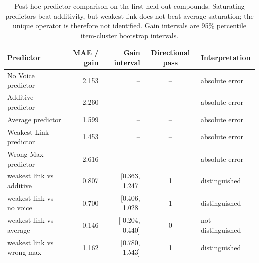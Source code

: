 \begin{table}[H]
\centering
\footnotesize
\setlength{\tabcolsep}{4pt}
\begin{tabularx}{\textwidth}{XrrcX}
\toprule
Predictor & MAE / gain & Gain interval & Directional pass & Interpretation \\
\midrule
No Voice predictor & 2.153 & -- & -- & absolute error \\
Additive predictor & 2.260 & -- & -- & absolute error \\
Average predictor & 1.599 & -- & -- & absolute error \\
Weakest Link predictor & 1.453 & -- & -- & absolute error \\
Wrong Max predictor & 2.616 & -- & -- & absolute error \\
\midrule
weakest link vs additive & 0.807 & [0.363, 1.247] & 1 & distinguished \\
weakest link vs no voice & 0.700 & [0.406, 1.028] & 1 & distinguished \\
weakest link vs average & 0.146 & [-0.204, 0.440] & 0 & not distinguished \\
weakest link vs wrong max & 1.162 & [0.780, 1.543] & 1 & distinguished \\
\bottomrule
\end{tabularx}
\caption{Post-hoc predictor comparison on the first held-out compounds. Saturating predictors beat additivity, but weakest-link does not beat average saturation; the unique operator is therefore not identified. Gain intervals are 95\% percentile item-cluster bootstrap intervals.}
\label{tab:model-comparison}
\end{table}
